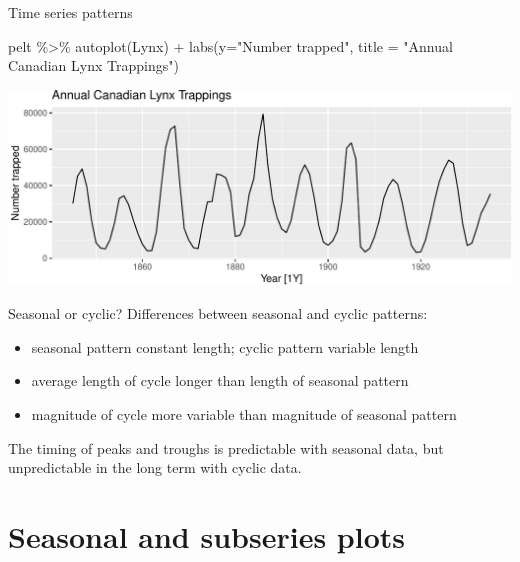 \documentclass[14pt,ignorenonframetext,aspectratio=169]{beamer}
\newenvironment{Shaded}{\begin{snugshade}}{\end{snugshade}}
\newcommand{\AttributeTok}[1]{\textcolor[rgb]{0.77,0.63,0.00}{#1}}
\newcommand{\FunctionTok}[1]{\textcolor[rgb]{0.00,0.00,0.00}{#1}}
\newcommand{\NormalTok}[1]{#1}
\newcommand{\SpecialCharTok}[1]{\textcolor[rgb]{0.00,0.00,0.00}{#1}}
\newcommand{\StringTok}[1]{\textcolor[rgb]{0.31,0.60,0.02}{#1}}
\providecommand{\tightlist}{%
  \setlength{\itemsep}{0pt}\setlength{\parskip}{0pt}}
\renewenvironment{Shaded}{\color{black}\begin{snugshade}\color{black}}{\end{snugshade}}
\renewenvironment{Shaded}{\color{black}\fontsize{10}{10}\sf\begin{snugshade}\color{black}}{\end{snugshade}}
\begin{document}
\begin{frame}[fragile]{Time series patterns}
\protect\hypertarget{time-series-patterns-5}{}
\fontsize{9}{9}\sf

\begin{Shaded}
\begin{Highlighting}[]
\NormalTok{pelt }\SpecialCharTok{\%\textgreater{}\%}
  \FunctionTok{autoplot}\NormalTok{(Lynx) }\SpecialCharTok{+}
  \FunctionTok{labs}\NormalTok{(}\AttributeTok{y=}\StringTok{"Number trapped"}\NormalTok{, }\AttributeTok{title =} \StringTok{"Annual Canadian Lynx Trappings"}\NormalTok{)}
\end{Highlighting}
\end{Shaded}

\includegraphics{2-tsgraphics_files/figure-beamer/unnamed-chunk-11-1.pdf}
\end{frame}

\begin{frame}{Seasonal or cyclic?}
\protect\hypertarget{seasonal-or-cyclic}{}
\alert{Differences between seasonal and cyclic patterns:}

\begin{itemize}
\tightlist
\item
  seasonal pattern constant length; cyclic pattern variable length
\item
  average length of cycle longer than length of seasonal pattern
\item
  magnitude of cycle more variable than magnitude of seasonal pattern
\end{itemize}

\pause

\begin{alertblock}{}
The timing of peaks and troughs is predictable with seasonal data, but unpredictable in the long term with cyclic data.
\end{alertblock}
\end{frame}

\hypertarget{seasonal-and-subseries-plots}{%
\section{Seasonal and subseries
plots}\label{seasonal-and-subseries-plots}}
\end{document}
